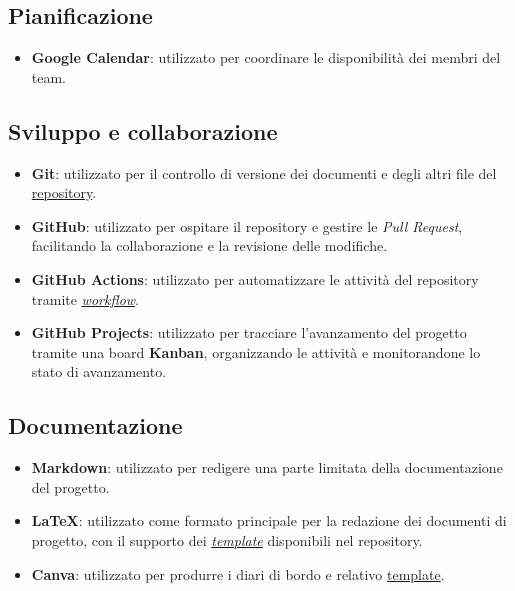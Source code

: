 \documentclass[11pt, a4paper]{article}
\begin{document}
\subsection{Pianificazione}
\begin{itemize}
    \item \textbf{Google Calendar}: utilizzato per coordinare le disponibilità dei membri del team.
\end{itemize}

\subsection{Sviluppo e collaborazione}
\begin{itemize}
    \item \textbf{Git}: utilizzato per il controllo di versione dei documenti e degli altri file del \href{https://github.com/On-By-One-Team/On-By-One.github.io}{repository}.
    \item \textbf{GitHub}: utilizzato per ospitare il repository e gestire le \textit{Pull Request}, facilitando la collaborazione e la revisione delle modifiche.
    \item \textbf{GitHub Actions}: utilizzato per automatizzare le attività del repository tramite \href{https://github.com/On-By-One-Team/On-By-One.github.io/tree/main/.github/workflows}{\textit{workflow}}.
    \item \textbf{GitHub Projects}: utilizzato per tracciare l'avanzamento del progetto tramite una board \textbf{Kanban}, organizzando le attività e monitorandone lo stato di avanzamento.
\end{itemize}

\subsection{Documentazione}
\begin{itemize}
    \item \textbf{Markdown}: utilizzato per redigere una parte limitata della documentazione del progetto.
    \item \textbf{LaTeX}: utilizzato come formato principale per la redazione dei documenti di progetto, con il supporto dei \href{https://github.com/On-By-One-Team/On-By-One.github.io/tree/main/docs/tex/templates}{\textit{template}} disponibili nel repository.
    \item \textbf{Canva}: utilizzato per produrre i diari di bordo e relativo \href{https://www.canva.com/design/DAXYpWf746s/uXPPm-JCKg6TbuRorlvcWQ/view?utm_content=DAXYpWf746s&utm_campaign=designshare&utm_medium=link&utm_source=publishsharelink&mode=preview}{template}.
\end{itemize}
\end{document}
